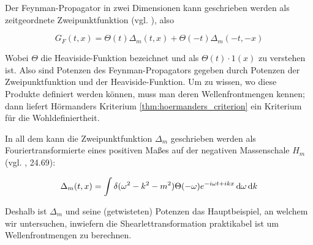 Der Feynman-Propagator in zwei Dimensionen kann geschrieben werden als zeitgeordnete Zweipunktfunktion (vgl. \textcite{ReedSimon}), also

\begin{equation}
    G_F(t,x)
    =
    \Theta (t)\Delta_m(t,x) + \Theta(-t)\Delta_m(-t,-x)
    \label{eq:feynman_propgator_as_product}
\end{equation}

Wobei $\Theta$ die Heaviside-Funktion bezeichnet und als $\Theta(t) \cdot 1(x)$ zu verstehen ist. Also sind Potenzen des Feynman-Propagators gegeben durch Potenzen der Zweipunktfunktion und der Heaviside-Funktion. Um zu wissen, wo diese Produkte definiert werden können, muss man deren Wellenfrontmengen kennen; dann liefert Hörmanders Kriterium \ref{thm:hoermanders_criterion} ein Kriterium für die Wohldefiniertheit.

In all dem kann die Zweipunktfunktion $\Delta_m$ geschrieben werden als Fouriertransformierte eines positiven Maßes auf der negativen Massenschale $H_m$ (vgl. \textcite{Schwartz2014}, 24.69):

\begin{equation}
    \Delta_m (t,x) = \int \delta (\omega^2-k^2-m^2)
                    \Theta(-\omega)e^{-i\omega t + i k x} \mathop{}\!\mathrm{d} \omega \mathop{}\!\mathrm{d} k
\label{eq:delta_m}
\end{equation}

Deshalb ist $\Delta_m$ und seine (getwisteten) Potenzen das Hauptbeispiel, an welchem wir untersuchen, inwiefern die Shearlettransformation praktikabel ist um Wellenfrontmengen zu berechnen.

